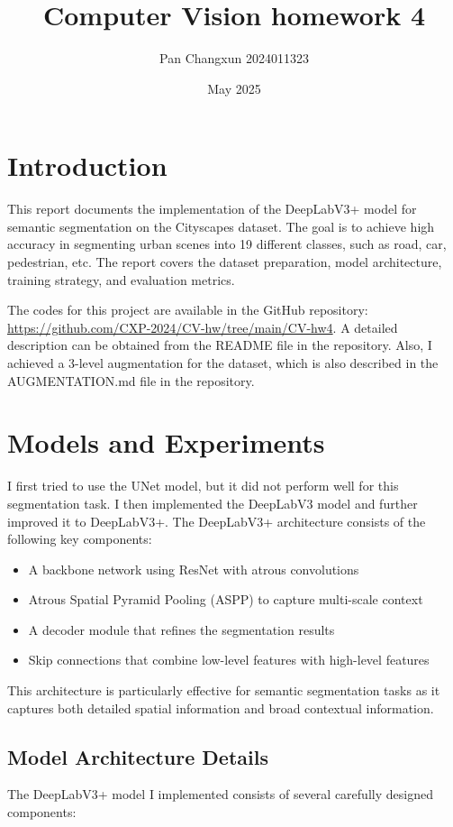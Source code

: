 \documentclass[]{article}
\title{\textbf{Computer Vision homework 4}}
\author{Pan Changxun 2024011323}
\date{May 2025}
\begin{document}
\maketitle

\section{Introduction}
This report documents the implementation of the DeepLabV3+ model for semantic segmentation on the Cityscapes dataset. The goal is to achieve high accuracy in segmenting urban scenes into 19 different classes, such as road, car, pedestrian, etc. The report covers the dataset preparation, model architecture, training strategy, and evaluation metrics.

The codes for this project are available in the GitHub repository: \url{https://github.com/CXP-2024/CV-hw/tree/main/CV-hw4}.
A detailed description can be obtained from the README file in the repository. Also, I achieved a 3-level augmentation for the dataset, which is also described in the AUGMENTATION.md file in the repository.
\section{Models and Experiments}
I first tried to use the UNet model, but it did not perform well for this segmentation task. I then implemented the DeepLabV3 model and further improved it to DeepLabV3+. The DeepLabV3+ architecture consists of the following key components:

\begin{itemize}
    \item A backbone network using ResNet with atrous convolutions
    \item Atrous Spatial Pyramid Pooling (ASPP) to capture multi-scale context
    \item A decoder module that refines the segmentation results
    \item Skip connections that combine low-level features with high-level features
\end{itemize}

This architecture is particularly effective for semantic segmentation tasks as it captures both detailed spatial information and broad contextual information.

\subsection{Model Architecture Details}
The DeepLabV3+ model I implemented consists of several carefully designed components:
\end{document}
